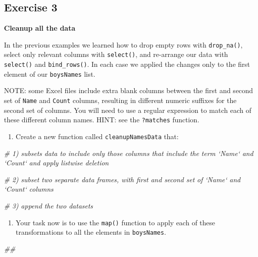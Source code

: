 \documentclass[
]{book}
\newenvironment{Shaded}{\begin{snugshade}}{\end{snugshade}}
\newcommand{\CommentTok}[1]{\textcolor[rgb]{0.56,0.35,0.01}{\textit{#1}}}
\providecommand{\tightlist}{%
  \setlength{\itemsep}{0pt}\setlength{\parskip}{0pt}}
\begin{document}
\hypertarget{exercise-3-3}{%
\subsection{Exercise 3}\label{exercise-3-3}}

\textbf{Cleanup all the data}

In the previous examples we learned how to drop empty rows with
\texttt{drop\_na()}, select only relevant columns with \texttt{select()}, and re-arrange
our data with \texttt{select()} and \texttt{bind\_rows()}. In each case we applied the
changes only to the first element of our \texttt{boysNames} list.

NOTE: some Excel files include extra blank columns between the first and second
set of \texttt{Name} and \texttt{Count} columns, resulting in different numeric suffixes
for the second set of columns. You will need to use a regular expression
to match each of these different column names. HINT: see the \texttt{?matches}
function.

\begin{enumerate}
\def\labelenumi{\arabic{enumi}.}
\tightlist
\item
  Create a new function called \texttt{cleanupNamesData} that:
\end{enumerate}

\begin{Shaded}
\begin{Highlighting}[]
\CommentTok{# 1) subsets data to include only those columns that include the term `Name` and `Count` and apply listwise deletion}

\CommentTok{# 2) subset two separate data frames, with first and second set of `Name` and `Count` columns}

\CommentTok{# 3) append the two datasets}
\end{Highlighting}
\end{Shaded}

\begin{enumerate}
\def\labelenumi{\arabic{enumi}.}
\setcounter{enumi}{1}
\tightlist
\item
  Your task now is to use the \texttt{map()} function to apply each of these
  transformations to all the elements in \texttt{boysNames}.
\end{enumerate}

\begin{Shaded}
\begin{Highlighting}[]
\CommentTok{## }
\end{Highlighting}
\end{Shaded}
\end{document}
